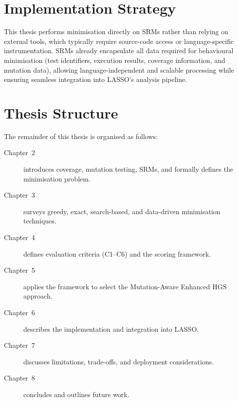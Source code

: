 \section{Implementation Strategy}

This thesis performs minimisation directly on SRMs rather than relying on external tools, which typically require source-code access or language-specific instrumentation. SRMs already encapsulate all data required for behavioural minimisation (test identifiers, execution results, coverage information, and mutation data), allowing language-independent and scalable processing while ensuring seamless integration into LASSO's analysis pipeline.

\section{Thesis Structure}

The remainder of this thesis is organised as follows:
\begin{description}
  \item[Chapter~2] introduces coverage, mutation testing, SRMs, and formally defines the minimisation problem.
  \item[Chapter~3] surveys greedy, exact, search-based, and data-driven minimisation techniques.
  \item[Chapter~4] defines evaluation criteria (C1--C6) and the scoring framework.
  \item[Chapter~5] applies the framework to select the Mutation-Aware Enhanced HGS approach.
  \item[Chapter~6] describes the implementation and integration into LASSO.
  \item[Chapter~7] discusses limitations, trade-offs, and deployment considerations.
  \item[Chapter~8] concludes and outlines future work.
\end{description}
